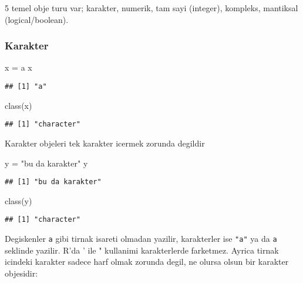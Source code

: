 \documentclass[
]{book}
\newenvironment{Shaded}{\begin{snugshade}}{\end{snugshade}}
\newcommand{\FunctionTok}[1]{\textcolor[rgb]{0.00,0.00,0.00}{#1}}
\newcommand{\NormalTok}[1]{#1}
\newcommand{\OtherTok}[1]{\textcolor[rgb]{0.56,0.35,0.01}{#1}}
\newcommand{\StringTok}[1]{\textcolor[rgb]{0.31,0.60,0.02}{#1}}
\begin{document}
5 temel obje turu var; karakter, numerik, tam sayi (integer), kompleks, mantiksal (logical/boolean).

\hypertarget{karakter}{%
\subsubsection{Karakter}\label{karakter}}

\begin{Shaded}
\begin{Highlighting}[]
\NormalTok{x }\OtherTok{=} \StringTok{\textquotesingle{}a\textquotesingle{}}
\NormalTok{x}
\end{Highlighting}
\end{Shaded}

\begin{verbatim}
## [1] "a"
\end{verbatim}

\begin{Shaded}
\begin{Highlighting}[]
\FunctionTok{class}\NormalTok{(x)}
\end{Highlighting}
\end{Shaded}

\begin{verbatim}
## [1] "character"
\end{verbatim}

Karakter objeleri tek karakter icermek zorunda degildir

\begin{Shaded}
\begin{Highlighting}[]
\NormalTok{y }\OtherTok{=} \StringTok{"bu da karakter"}
\NormalTok{y}
\end{Highlighting}
\end{Shaded}

\begin{verbatim}
## [1] "bu da karakter"
\end{verbatim}

\begin{Shaded}
\begin{Highlighting}[]
\FunctionTok{class}\NormalTok{(y)}
\end{Highlighting}
\end{Shaded}

\begin{verbatim}
## [1] "character"
\end{verbatim}

Degiskenler \texttt{a} gibi tirnak isareti olmadan yazilir, karakterler ise \texttt{"a"} ya da \texttt{\textquotesingle{}a\textquotesingle{}} seklinde yazilir. R'da ' ile " kullanimi karakterlerde farketmez. Ayrica tirnak icindeki karakter sadece harf olmak zorunda degil, ne olursa olsun bir karakter objesidir:
\end{document}

